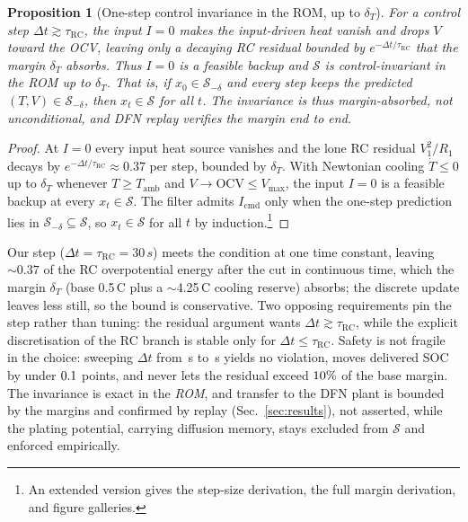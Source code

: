 \documentclass[conference]{IEEEtran}
\newtheorem{proposition}{Proposition}
\newcommand{\SI}[2]{#1\,#2}
\newcommand{\degreeCelsius}{\textdegree C}
\begin{document}
\begin{proposition}[One-step control invariance in the ROM, up to $\delta_T$]\label{prop:inv}
For a control step $\Delta t\gtrsim\tau_\mathrm{RC}$, the input $I=0$ makes the input-driven heat
vanish and drops $V$ toward the OCV, leaving only a decaying RC residual bounded by
$e^{-\Delta t/\tau_\mathrm{RC}}$ that the margin $\delta_T$ absorbs. Thus $I=0$ is a feasible backup
and $\mathcal S$ is control-invariant in the ROM \emph{up to} $\delta_T$. That is, if
$x_0\in\mathcal S_{-\delta}$ and every step keeps the predicted $(T,V)\in\mathcal S_{-\delta}$, then
$x_t\in\mathcal S$ for all $t$. The invariance is thus margin-absorbed, not unconditional, and DFN
replay verifies the margin end to end.
\end{proposition}
\begin{proof}
At $I=0$ every input heat source vanishes and the lone RC residual $V_1^2/R_1$ decays by
$e^{-\Delta t/\tau_\mathrm{RC}}{\approx}0.37$ per step, bounded by $\delta_T$. With Newtonian cooling
$\dot T\le0$ up to $\delta_T$ whenever $T\ge T_\mathrm{amb}$ and $V\to\mathrm{OCV}\le V_{\max}$, the
input $I=0$ is a feasible backup at every $x_t\in\mathcal S$. The filter admits $I_\mathrm{cmd}$ only
when the one-step prediction lies in $\mathcal S_{-\delta}\subseteq\mathcal S$, so
$x_t\in\mathcal S$ for all $t$ by induction.\footnote{An extended version gives the step-size
derivation, the full margin derivation, and figure galleries.}
\end{proof}

Our step ($\Delta t=\tau_\mathrm{RC}=\SI{30}{s}$) meets the condition at one time constant, leaving
$\sim0.37$ of the RC overpotential energy after the cut in continuous time, which the margin $\delta_T$
(base \SI{0.5}{\degreeCelsius} plus a $\sim$\SI{4.25}{\degreeCelsius} cooling reserve) absorbs; the
discrete update leaves less still, so the bound is conservative. Two opposing requirements pin the step
rather than tuning: the residual argument wants $\Delta t\gtrsim\tau_\mathrm{RC}$, while the explicit
discretisation of the RC branch is stable only for $\Delta t\le\tau_\mathrm{RC}$. Safety is not fragile
in the choice: sweeping $\Delta t$ from \SI{\stepLo}{s} to \SI{\stepHi}{s} yields no violation, moves
delivered SOC by under $0.1$ points, and never lets the residual exceed $10\%$ of
the base margin. The invariance is exact in the
\emph{ROM}, and transfer to the DFN plant is bounded by the margins and confirmed by replay
(Sec.~\ref{sec:results}), not asserted, while the plating potential, carrying diffusion
memory, stays excluded from $\mathcal S$ and enforced empirically.
\end{document}
